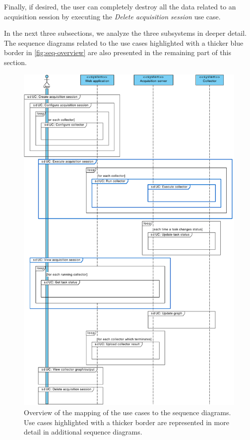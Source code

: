 Finally, if desired, the user can completely destroy all the data related to an acquisition session by executing the \emph{Delete acquisition session} use case.

In the next three subsections, we analyze the three subsystems in deeper detail. The sequence diagrams related to the use cases highlighted with a thicker blue border in \vref{fig:seq-overview} are also presented in the remaining part of this section.

\begin{figure}
  \centering
  \includegraphics[width=0.95\linewidth]{images/seq-overview}
  \caption[Overview of the mapping of the use cases to the sequence diagrams.]{Overview of the mapping of the use cases to the sequence diagrams. Use cases highlighted with a thicker border are represented in more detail in additional sequence diagrams.}
  \label{fig:seq-overview}
\end{figure}


